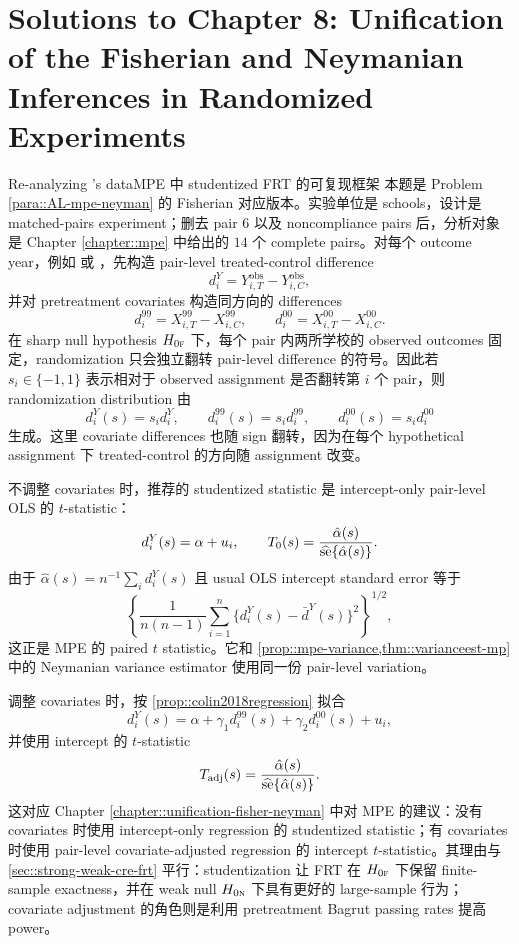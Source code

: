 \chapter{Solutions to Chapter 8: Unification of the Fisherian and Neymanian Inferences in Randomized Experiments}
\label{sol:chapter08}

\begin{exercisesolution}{Re-analyzing \citet{angrist2009effects}'s data}{MPE 中 studentized FRT 的可复现框架}
本题是 Problem \ref{para::AL-mpe-neyman} 的 Fisherian 对应版本。实验单位是 schools，设计是 matched-pairs experiment；删去 pair 6 以及 noncompliance pairs 后，分析对象是 Chapter \ref{chapter::mpe} 中给出的 $14$ 个 complete pairs。对每个 outcome year，例如  或 ，先构造 pair-level treated-control difference
\[
d^Y_i=Y_{i,T}^{\mathrm{obs}}-Y_{i,C}^{\mathrm{obs}},
\]
并对 pretreatment covariates 构造同方向的 differences
\[
d^{99}_i=X^{99}_{i,T}-X^{99}_{i,C},\qquad
d^{00}_i=X^{00}_{i,T}-X^{00}_{i,C}.
\]
在 sharp null hypothesis $H_{0\textsc{f}}$ 下，每个 pair 内两所学校的 observed outcomes 固定，randomization 只会独立翻转 pair-level difference 的符号。因此若 $s_i\in\{-1,1\}$ 表示相对于 observed assignment 是否翻转第 $i$ 个 pair，则 randomization distribution 由
\[
d^Y_i(s)=s_id^Y_i,\qquad
d^{99}_i(s)=s_id^{99}_i,\qquad
d^{00}_i(s)=s_id^{00}_i
\]
生成。这里 covariate differences 也随 sign 翻转，因为在每个 hypothetical assignment 下 treated-control 的方向随 assignment 改变。

不调整 covariates 时，推荐的 studentized statistic 是 intercept-only pair-level OLS 的 $t$-statistic：
\[
d^Y_i(s)=\alpha+u_i,\qquad
T_0(s)=\frac{\hat\alpha(s)}{\widehat{\textup{se}}\{\hat\alpha(s)\}}.
\]
由于 $\hat\alpha(s)=n^{-1}\sum_i d^Y_i(s)$ 且 usual OLS intercept standard error 等于
\[
\left\{\frac{1}{n(n-1)}\sum_{i=1}^n
\{d^Y_i(s)-\bar d^Y(s)\}^2\right\}^{1/2},
\]
这正是 MPE 的 paired $t$ statistic。它和 \cref{prop::mpe-variance,thm::varianceest-mp} 中的 Neymanian variance estimator 使用同一份 pair-level variation。

调整 covariates 时，按 \cref{prop::colin2018regression} 拟合
\[
d^Y_i(s)=\alpha+\gamma_1d^{99}_i(s)+\gamma_2d^{00}_i(s)+u_i,
\]
并使用 intercept 的 $t$-statistic
\[
T_{\mathrm{adj}}(s)=
\frac{\hat\alpha(s)}{\widehat{\textup{se}}\{\hat\alpha(s)\}}.
\]
这对应 Chapter \ref{chapter::unification-fisher-neyman} 中对 MPE 的建议：没有 covariates 时使用 intercept-only regression 的 studentized statistic；有 covariates 时使用 pair-level covariate-adjusted regression 的 intercept $t$-statistic。其理由与 \cref{sec::strong-weak-cre-frt} 平行：studentization 让 FRT 在 $H_{0\textsc{f}}$ 下保留 finite-sample exactness，并在 weak null $H_{0\textsc{n}}$ 下具有更好的 large-sample 行为；covariate adjustment 的角色则是利用 pretreatment Bagrut passing rates 提高 power。


\end{exercisesolution}
